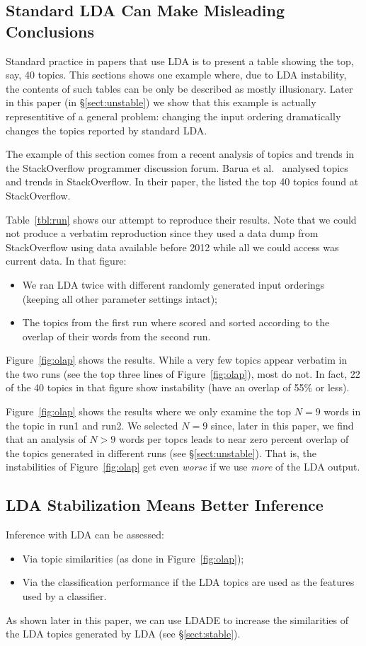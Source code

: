 \documentclass[twocolumn,5p,sort&compress]{elsarticle}
\newcommand{\tion}[1]{{\S}\ref{sect:#1}}
\newcommand{\fig}[1]{Figure~\ref{fig:#1}}
\newcommand{\bi}{\begin{itemize}}
\newcommand{\ei}{\end{itemize}}
\theoremstyle{break}
\begin{document}
\subsection{Standard LDA Can Make Misleading Conclusions}
Standard practice in papers that use LDA is to present a table showing the top, say, 40
topics.
This sections shows one example where, due to LDA instability,
the contents of such tables can be only be described as  mostly illusionary.
Later in this paper (in \tion{unstable}) we show that this example is actually representitive of
a general problem: changing the input ordering dramatically changes the topics
reported by standard LDA.

The example of this section comes from a recent analysis
of topics and trends in the StackOverflow programmer discussion forum.
Barua et al.~\cite{barua2014developers}
analysed topics and trends in StackOverflow. In their paper,
the listed the top
40 topics found at StackOverflow.

Table~\ref{tbl:run} shows our attempt to reproduce their results.
Note that we could not produce a verbatim reproduction since
they used a 
data dump from
StackOverflow using data available before 2012 while all we could access was current data.
In that figure:
\bi
\item
  We ran LDA twice with different
randomly generated input orderings (keeping all other parameter settings intact);
\item
  The topics from the first run where scored and sorted
according to the overlap of their words
from the second run.
\ei
\fig{olap} shows the results.
While
a very few topics appear verbatim in the two runs (see the top three lines of \fig{olap}),
most do not. In fact,
22 of the 40 topics in that figure show  instability (have an overlap of 55\% or less).

\fig{olap} shows the results where we only
examine the top $N=9$ words in the topic in run1 and run2. We selected $N=9$ since,
later in this paper, we find that an analysis of $N>9$ words per topcs leads to near
 zero percent overlap of the topics generated in different runs (see \tion{unstable}).
That is, the instabilities of \fig{olap} get even {\em worse} if we use {\em more} of the LDA output.

\subsection{LDA Stabilization Means Better Inference}

Inference with LDA can be assessed:
\bi
\item
Via topic similarities (as done in \fig{olap});
\item
Via the classification performance if the LDA topics are used as the features used by a classifier.
\ei
As shown later in this paper, we can use LDADE to increase the similarities of the LDA
topics generated by LDA (see \tion{stable}).
\end{document}
